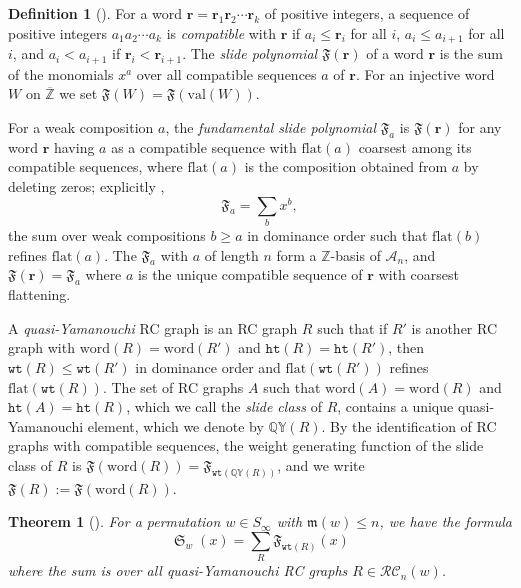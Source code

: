 \documentclass{amsart}
\newtheorem{theorem}{Theorem}[section]
\theoremstyle{definition}
\newtheorem{definition}[lemma]{Definition}
\theoremstyle{remark}
\numberwithin{equation}{subsection}
\DeclareMathOperator{\sch}{\mathfrak{S}}
\newcommand{\wtt}{\mathtt{wt}}
\newcommand{\QY}{\ensuremath{\mathbb{QY}}}
\newcommand{\hr}{\mathtt{ht}}
\newcommand{\RC}{\mathcal{RC}}
\newcommand{\coma}{\mathcal{A}}
\newcommand{\maxd}{\mathfrak{m}}
\begin{document}
\begin{definition}[{\cite{assaf2017slide}}]\label{definition:slide}
For a word $\mathbf{r}=\mathbf{r}_1\mathbf{r}_2\cdots \mathbf{r}_k$ of positive integers, a sequence of positive integers $a_1a_2\cdots a_k$ is \emph{compatible} with $\mathbf{r}$ if $a_i\leq \mathbf{r}_i$ for all $i$, $a_i\leq a_{i+1}$ for all $i$, and $a_i<a_{i+1}$ if $\mathbf{r}_i<\mathbf{r}_{i+1}$. The \emph{slide polynomial} $\mathfrak{F}(\mathbf{r})$ of a word $\mathbf{r}$ is the sum of the monomials $x^a$ over all compatible sequences $a$ of $\mathbf{r}$. For an injective word $W$ on $\overline{\mathbb{Z}}$ we set $\mathfrak F(W)=\mathfrak F(\mathrm{val}(W))$.

For a weak composition $a$, the \emph{fundamental slide polynomial} $\mathfrak{F}_a$ is $\mathfrak{F}(\mathbf r)$ for any word $\mathbf r$ having $a$ as a compatible sequence with $\mathrm{flat}(a)$ coarsest among its compatible sequences, where $\mathrm{flat}(a)$ is the composition obtained from $a$ by deleting zeros; explicitly \cite{assaf2017slide},
$$\mathfrak{F}_a = \sum_{b} x^b,$$
the sum over weak compositions $b\geq a$ in dominance order such that $\mathrm{flat}(b)$ refines $\mathrm{flat}(a)$. The $\mathfrak F_a$ with $a$ of length $n$ form a $\mathbb{Z}$-basis of $\coma_n$, and $\mathfrak F(\mathbf r)=\mathfrak F_{a}$ where $a$ is the unique compatible sequence of $\mathbf r$ with coarsest flattening.

A \emph{quasi-Yamanouchi} RC graph is an RC graph $R$ such that if $R'$ is another RC graph with $\mathrm{word}(R)=\mathrm{word}(R')$ and $\hr(R)=\hr(R')$, then $\wtt(R)\leq \wtt(R')$ in dominance order and $\mathrm{flat}(\wtt(R'))$ refines $\mathrm{flat}(\wtt(R))$. The set of RC graphs $A$ such that $\mathrm{word}(A)=\mathrm{word}(R)$ and $\hr(A)=\hr(R)$, which we call the \emph{slide class} of $R$, contains a unique quasi-Yamanouchi element, which we denote by $\QY(R)$. By the identification of RC graphs with compatible sequences, the weight generating function of the slide class of $R$ is $\mathfrak F(\mathrm{word}(R)) = \mathfrak F_{\wtt(\QY(R))}$, and we write $\mathfrak F(R):=\mathfrak F(\mathrm{word}(R))$.
\end{definition}

\begin{theorem}[{\cite[Theorem~3.13]{assaf2017slide}}]\label{theorem:assafsearles}
  For a permutation $w\in S_\infty$ with $\maxd(w)\leq n$, we have the formula
  $$\sch_w(x) = \sum_{R} \mathfrak{F}_{\wtt(R)}(x)$$
  where the sum is over all quasi-Yamanouchi RC graphs $R\in\RC_n(w)$.
\end{theorem}
\end{document}
